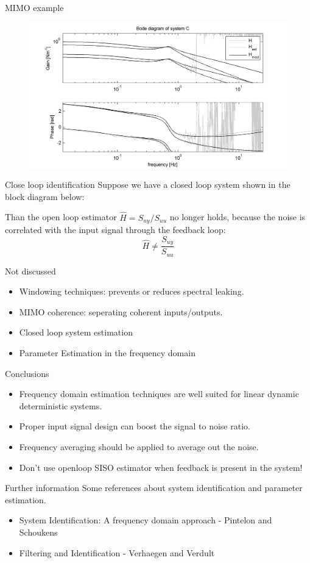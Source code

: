 \documentclass{beamer}
\begin{document}
\begin{frame}{MIMO example}
\begin{figure}
\includegraphics[scale=0.6]{images/MIMObode}
\end{figure}
\end{frame}

\begin{frame}{Close loop identification}
Suppose we have a closed loop system shown in the block diagram below:

Than the open loop estimator $\hat{H}=S_{uy}/S_{uu}$ no longer holds, because the noise is correlated with the input signal through the feedback loop:
\begin{equation} 						\hat{H}	\neq \frac{S_{uy}}{S_{uu}} \end{equation}
\end{frame}

\begin{frame}{Not discussed}
		\begin{itemize}
		\item Windowing  techniques: prevents or reduces spectral leaking.
		\item MIMO coherence: seperating coherent inputs/outputs.
		\item Closed loop system estimation
		\item Parameter Estimation in the frequency domain
		\end{itemize}
\end{frame}

\begin{frame}{Conclusions}
	\begin{itemize}
	\item Frequency domain estimation techniques are well suited for linear dynamic deterministic systems.
	\item Proper input signal design can boost the signal to noise ratio.
	\item Frequency averaging should be applied to average out the noise.
	\item Don't use openloop SISO estimator when feedback is present in the system!
	\end{itemize}
\end{frame}

\begin{frame}{Further information}
Some references about system identification and parameter estimation.
		\begin{itemize}
		\item System Identification: A frequency domain approach - Pintelon and Schoukens 
		\item Filtering and Identification - Verhaegen and Verdult
		\end{itemize}
\end{frame}
\end{document}

